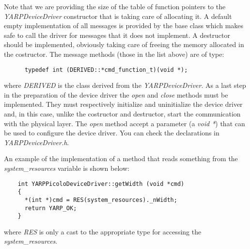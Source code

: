 Note that we are providing the size of the table of function pointers to the {\em YARPDeviceDriver} constructor that is taking care of allocating it. A default empty implementation of all messages is provided by the base class which makes safe to call the driver for messages that it does not implement. A destructor should be implemented, obviously taking care of freeing the memory allocated in the costructor. The message methods (those in the list above) are of type:

\begin{verbatim}
      typedef int (DERIVED::*cmd_function_t)(void *); 
\end{verbatim}

\noindent where {\em DERIVED} is the class derived from the {\em YARPDeviceDriver}. As a last step in the preparation of the device driver the {\em open} and {\em close} methods must be implemented. They must respectively initialize and uninitialize the device driver and, in this case, unlike the costructor and destructor, start the communication with the physical layer. The {\em open} method accept a parameter (a {\em void *}) that can be used to configure the device driver. You can check the declarations in {\em YARPDeviceDriver.h}.

An example of the implementation of a method that reads something from the {\em system\_resources} variable is shown below:

\begin{verbatim}
    int YARPPicoloDeviceDriver::getWidth (void *cmd)
    {
      *(int *)cmd = RES(system_resources)._nWidth;
      return YARP_OK;
    }
\end{verbatim}

\noindent where {\em RES} is only a cast to the appropriate type for accessing the {\em system\_resources}.


